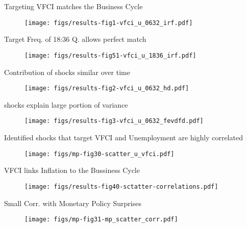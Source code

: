 \begin{frame}{Targeting VFCI matches the Business Cycle}

  \begin{figure}
    \texttt{[image: figs/results-fig1-vfci\_u\_0632\_irf.pdf]}
  \end{figure}

\end{frame}


\begin{frame}{Target Freq. of 18:36 Q. allows perfect match}

  \begin{figure}
    \texttt{[image: figs/results-fig51-vfci\_u\_1836\_irf.pdf]}
  \end{figure}

\end{frame}



\begin{frame}{Contribution of shocks similar over time}

  \begin{figure}
    \texttt{[image: figs/results-fig2-vfci\_u\_0632\_hd.pdf]}
  \end{figure}

\end{frame}


\begin{frame}{shocks explain large portion of variance}

  \begin{figure}
    \texttt{[image: figs/results-fig3-vfci\_u\_0632\_fevdfd.pdf]}
  \end{figure}

\end{frame}



\begin{frame}{Identified shocks that target VFCI and Unemployment are highly correlated}

  \begin{figure}
    \texttt{[image: figs/mp-fig30-scatter\_u\_vfci.pdf]}
  \end{figure}

\end{frame}


\begin{frame}{VFCI links Inflation to the Bussiness Cycle}

  \vspace{0.5cm}

  \begin{figure}
    \texttt{[image: figs/results-fig40-sctatter-correlations.pdf]}
  \end{figure}

\end{frame}



\begin{frame}{Small Corr. with Monetary Policy Surprises}

  \vspace{0.5cm}

  \begin{figure}
    \texttt{[image: figs/mp-fig31-mp\_scatter\_corr.pdf]}
  \end{figure}

\end{frame}
